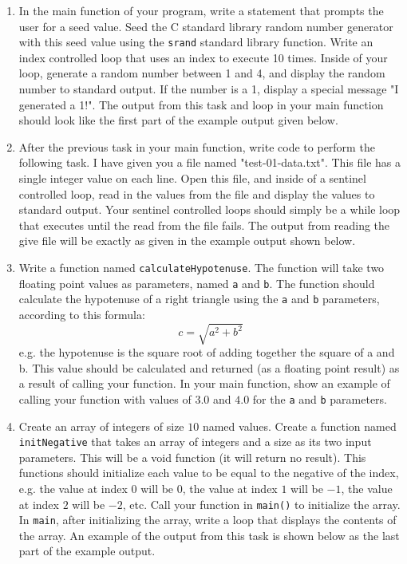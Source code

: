 \documentclass[11pt]{article}
\begin{document}
\begin{enumerate}
\item In the main function of your program, write a statement that
prompts the user for a seed value.  Seed the C standard library
random number generator with this seed value using the \verb~srand~
standard library function.  Write an index controlled loop that
uses an index to execute 10 times.  Inside of your loop, generate a
random number between 1 and 4, and display the random number to
standard output.  If the number is a 1, display a special message
"I generated a 1!".  The output from this task and loop in your
main function should look like the first part of the example
output given below.

\item After the previous task in your main function, write code to
perform the following task.  I have given you a file named
"test-01-data.txt".  This file has a single integer value on each
line.  Open this file, and inside of a sentinel controlled loop,
read in the values from the file and display the values to standard
output.  Your sentinel controlled loops should simply be a while
loop that executes until the read from the file fails.  The output
from reading the give file will be exactly as given in the example
output shown below.

\item Write a function named \verb~calculateHypotenuse~.  The function will
take two floating point values as parameters, named \verb~a~ and \verb~b~.
The function should calculate the hypotenuse of a right triangle
using the \verb~a~ and \verb~b~ parameters, according to this formula: $$ c =
   \sqrt{a^2 + b^2} $$ e.g. the hypotenuse is the square root of
adding together the square of a and b.  This value should be
calculated and returned (as a floating point result) as a result of
calling your function.  In your main function, show an example of
calling your function with values of $3.0$ and $4.0$ for the \verb~a~
and \verb~b~ parameters.

\item Create an array of integers of size $10$ named values.  Create a
function named \verb~initNegative~ that takes an array of integers and a
size as its two input parameters.  This will be a void function (it
will return no result).  This functions should initialize each
value to be equal to the negative of the index, e.g. the value at
index $0$ will be $0$, the value at index $1$ will be $-1$, the
value at index $2$ will be $-2$, etc.  Call your function in
\verb~main()~ to initialize the array.  In \verb~main~, after initializing
the array, write a loop that displays the contents of the array.
An example of the output from this task is shown below as the last
part of the example output.
\end{enumerate}
\end{document}
